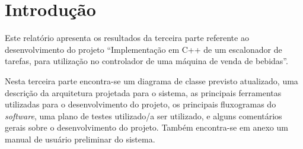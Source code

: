 %
%
%
%
%

%
%
%
%
%

\section{Introdução} \label{sec:introduction}

Este relatório apresenta os resultados da terceira parte referente ao desenvolvimento do projeto ``Implementação em C++ de um escalonador de tarefas, para utilização no controlador de uma máquina de venda de bebidas''.

Nesta terceira parte encontra-se um diagrama de classe previsto atualizado, uma descrição da arquitetura projetada para o sistema, as principais ferramentas utilizadas para o desenvolvimento do projeto, os principais fluxogramas do \textit{software}, uma plano de testes utilizado/a ser utilizado, e alguns comentários gerais sobre o desenvolvimento do projeto. Também encontra-se em anexo um manual de usuário preliminar do sistema.
